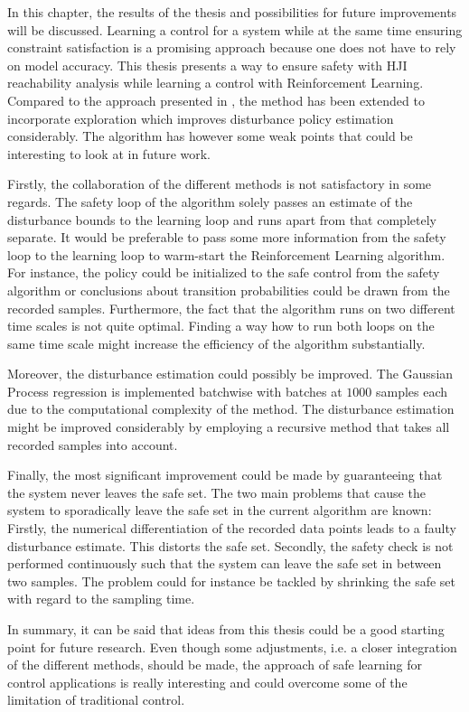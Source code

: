 \documentclass[../main.tex]{subfiles}
\begin{document}
In this chapter, the results of the thesis and possibilities for future improvements will be discussed. Learning a control for a system while at the same time ensuring constraint satisfaction is a promising approach because one does not have to rely on model accuracy. This thesis presents a way to ensure safety with HJI reachability analysis while learning a control with Reinforcement Learning. Compared to the approach presented in \cite{akametalu2014reachability}, the method has been extended to incorporate exploration which improves disturbance policy estimation considerably. The algorithm has however some weak points that could be interesting to look at in future work. \par
Firstly, the collaboration of the different methods is not satisfactory in some regards. The safety loop of the algorithm solely passes an estimate of the disturbance bounds to the learning loop and runs apart from that completely separate. It would be preferable to pass some more information from the safety loop to the learning loop to warm-start the Reinforcement Learning algorithm. For instance, the policy could be initialized to the safe control from the safety algorithm or conclusions about transition probabilities could be drawn from the recorded samples. Furthermore, the fact that the algorithm runs on two different time scales is not quite optimal. Finding a way how to run both loops on the same time scale might increase the efficiency of the algorithm substantially.\par
Moreover, the disturbance estimation could possibly be improved. The Gaussian Process regression is implemented batchwise with batches at $1000$ samples each due to the computational complexity of the method. The disturbance estimation might be improved considerably by employing a recursive method that takes all recorded samples into account. \par
Finally, the most significant improvement could be made by guaranteeing that the system never leaves the safe set. The two main problems that cause the system to sporadically leave the safe set in the current algorithm are known: Firstly, the numerical differentiation of the recorded data points leads to a faulty disturbance estimate. This distorts the safe set. Secondly, the safety check is not performed continuously such that the system can leave the safe set in between two samples. The problem could for instance be tackled by shrinking the safe set with regard to the sampling time.\par
In summary, it can be said that ideas from this thesis could be a good starting point for future research. Even though some adjustments, i.e. a closer integration of the different methods, should be made, the approach of safe learning for control applications is really interesting and could overcome some of the limitation of traditional control.
\end{document}
